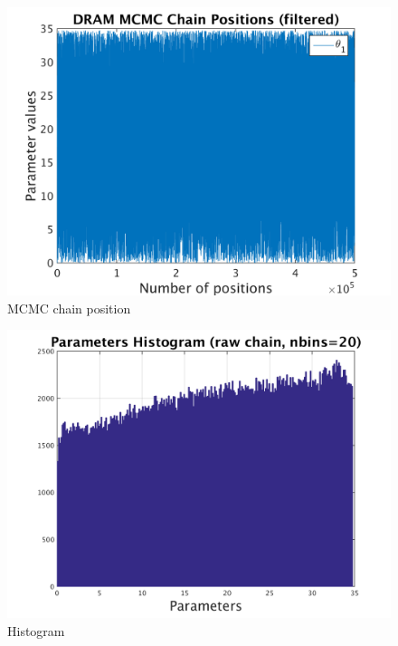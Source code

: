\begin{figure}[h!]
  
  \centering
   \includegraphics[scale=0.75]{output_1000/simple_ip_chain_pos_filt}
   \caption{MCMC chain position }
\end{figure}


\begin{figure}[h!]
  
  \centering
   \includegraphics[scale=0.75]{output_1000/simple_ip_hist_raw}
   \caption{Histogram}
\end{figure}



